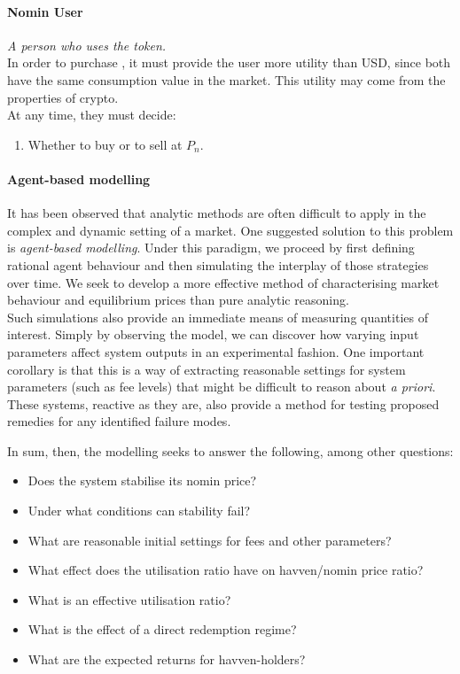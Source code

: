 \paragraph{Nomin User}
\emph{A person who uses the \NOM{} token.} \\
 
\noindent In order to purchase \NOM{}, it must provide the user more utility than USD, since both have the same consumption value in the market. This utility may come from the properties of crypto. \\

\noindent At any time, they must decide: 
\begin{enumerate}
\item{Whether to buy or to sell \NOM{} at $P_n$.}
\end{enumerate}

\paragraph{Agent-based modelling} It has been observed that analytic methods are often difficult to
apply in the complex and dynamic setting of a market.
One suggested solution to this problem is \textit{agent-based modelling}.
Under this paradigm, we proceed by first defining rational agent behaviour
and then simulating the interplay of those strategies over time.
We seek to develop a more effective
method of characterising market behaviour and equilibrium prices than pure analytic reasoning.~\cite{poggio2001agent}\\

\noindent Such simulations also provide an immediate means of measuring
quantities of interest. Simply by observing
the model, we can discover how varying input parameters
affect system outputs in an experimental fashion.
One important corollary is that this is a way of extracting reasonable
settings for system parameters (such as fee levels) that might be difficult
to reason about \textit{a priori}. These systems, reactive as they are,
also provide a method for testing proposed remedies for any identified failure
modes.


\noindent In sum, then, the modelling seeks to answer the following, among other questions:

\begin{itemize}
    \item Does the system stabilise its nomin price?
    \item Under what conditions can stability fail?
    \item What are reasonable initial settings for fees and other parameters?
    \item What effect does the utilisation ratio have on havven/nomin price ratio?
    \item What is an effective utilisation ratio?
    \item What is the effect of a direct redemption regime?
    \item What are the expected returns for havven-holders?
\end{itemize}

